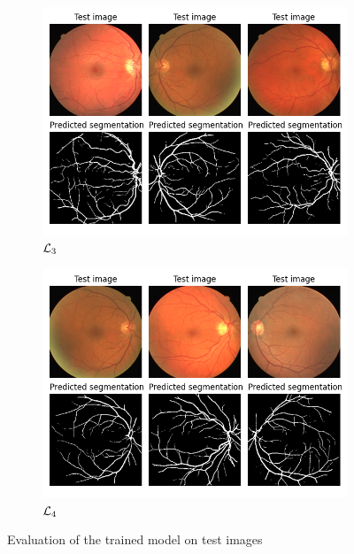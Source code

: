 \documentclass[onecolumn]{article}
\begin{document}
\begin{figure}[H]
\begin{subfigure}{0.45\textwidth}
        \includegraphics[width=\textwidth]{figures/results_on_testCE.png}
    \caption{$\mathcal{L}_3$}
    \end{subfigure}
    \begin{subfigure}{0.45\textwidth}
        \includegraphics[width=\textwidth]{figures/results_on_testCEwBL.png}
    \caption{$\mathcal{L}_4$}
    \end{subfigure}
    \caption{Evaluation of the trained model on test images}
    \label{fig:tests}
\end{figure}





\medskip




\clearpage
\appendix
\appendixpage %

\end{document}
